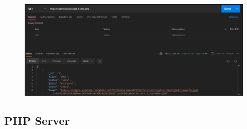 \documentclass[11pt]{article}
\begin{document}
\begin{figure}[H]
    \centering
    \includegraphics[width=.95\textwidth]{screenshots/postman 3.png}
    \caption{}
\end{figure}

\subsection{PHP Server}
\end{document}
